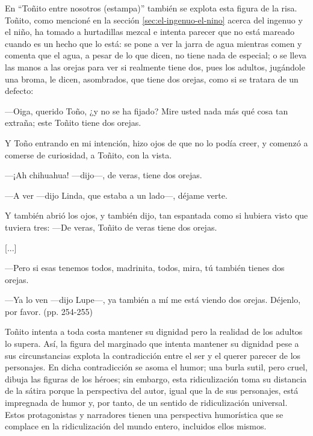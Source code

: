 \documentclass[14pt,twoside,final]{extbook} %
\begin{document}
En ``Toñito entre nosotros (estampa)'' también se explota esta figura de la risa. Toñito, como mencioné en la sección \ref{sec:el-ingenuo-el-nino} acerca del ingenuo y el niño, ha tomado a hurtadillas mezcal e intenta parecer que no está mareado cuando es un hecho que lo está: se pone a ver la jarra de agua mientras comen y comenta que el agua, a pesar de lo que dicen, no tiene nada de especial; o se lleva las manos a las orejas para ver si realmente tiene dos, pues los adultos, jugándole una broma, le dicen, asombrados, que tiene dos orejas, como si se tratara de un defecto:
\begin{quoting}
---Oiga, querido Toño, ¿y no se ha fijado? Mire usted nada más qué cosa tan extraña; este Toñito tiene dos orejas.

Y Toño entrando en mi intención, hizo ojos de que no lo podía creer, y comenzó a comerse de curiosidad, a Toñito, con la vista.

---¡Ah chihuahua! ---dijo---, de veras, tiene dos orejas.

---A ver ---dijo Linda, que estaba a un lado---, déjame verte.

Y también abrió los ojos, y también dijo, tan espantada como si hubiera visto que tuviera tres: ---De veras, Toñito de veras tiene dos orejas.

\centerline{[...]}

---Pero si esas tenemos todos, madrinita, todos, mira, tú también tienes dos orejas.

---Ya lo ven ---dijo Lupe---, ya también a mí me está viendo dos orejas. Déjenlo, por favor. (pp. 254-255)
\end{quoting}
Toñito intenta a toda costa mantener su dignidad pero la realidad de los adultos lo supera. Así, la figura del marginado que intenta mantener su dignidad pese a sus circunstancias explota la contradicción entre el ser y el querer parecer de los personajes. En dicha contradicción se asoma el
humor; una burla sutil, pero cruel, dibuja las figuras de los héroes; sin embargo, esta ridiculización toma su distancia de la sátira porque la perspectiva del autor, igual que la de sus personajes, está impregnada de humor y, por tanto, de un sentido de ridiculización universal. Estos protagonistas y narradores tienen una perspectiva humorística que se complace en la ridiculización del mundo entero, incluidos ellos mismos.
\cleardoublepage
\newpage
\pagestyle{empty}
\vspace*{42pt}
\end{document}
